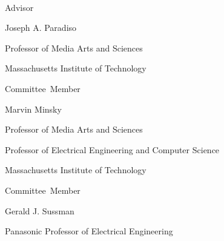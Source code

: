 \thispagestyle{empty}
\begin{center}
    \spacedlowsmallcaps{\myName} \\ \medskip                        

    \begingroup
        \color{Maroon}\spacedallcaps{\myTitle}
    \endgroup
\end{center}        

\vspace{40mm}

\begin{flushright}
  \vspace{10mm}

           Advisor\hspace{0.5cm}~\makebox[2.75in]{\hrulefill}

                                 Joseph A. Paradiso

                                 Professor of Media Arts and Sciences
                                 
                                 Massachusetts Institute of Technology
                                 
  \vspace{10mm}
  
  Committee~Member\hspace{0.5cm}~\makebox[2.75in]{\hrulefill}
  
                                 Marvin Minsky

                                 Professor of Media Arts and Sciences

                                 Professor of Electrical Engineering and Computer Science
                                 
                                 Massachusetts Institute of Technology
                                 
  \vspace{10mm}

  Committee~Member\hspace{0.5cm}~\makebox[2.75in]{\hrulefill}
  
                                 Gerald J. Sussman

                                 Panasonic Professor of Electrical Engineering
                                 

\end{flushright}

